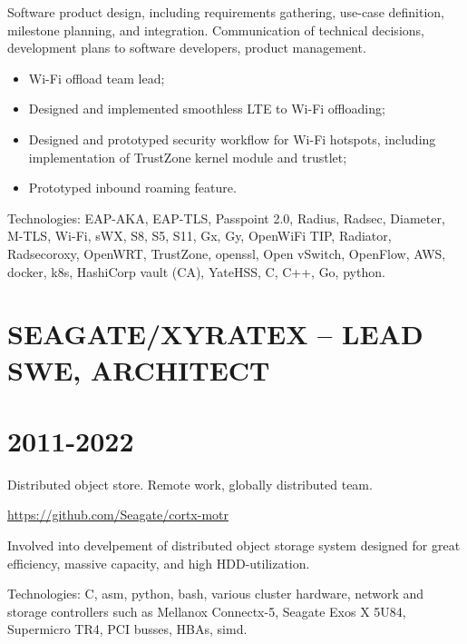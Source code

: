 \documentclass[8pt,a4paper]{article}
\begin{document}
Software product design, including requirements gathering, use-case
definition, milestone planning, and integration. Communication of
technical decisions, development plans to software developers,
product management.

\begin{itemize}
\item Wi-Fi offload team lead;
\item Designed and implemented smoothless LTE to Wi-Fi offloading;
\item Designed and prototyped security workflow for Wi-Fi hotspots,
including implementation of TrustZone kernel module and trustlet;
\item Prototyped inbound roaming feature.
\end{itemize}

Technologies: EAP-AKA, EAP-TLS, Passpoint 2.0, Radius, Radsec,
Diameter, M-TLS, Wi-Fi, sWX, S8, S5, S11, Gx, Gy, OpenWiFi TIP,
Radiator, Radsecoroxy, OpenWRT, TrustZone, openssl, Open vSwitch,
OpenFlow, AWS, docker, k8s, HashiCorp vault (CA), YateHSS, C, C++,
Go, python.


\section*{SEAGATE/XYRATEX -- LEAD SWE, ARCHITECT}
\label{sec:org223daaa}
\section*{2011-2022}
\label{sec:org5c9ee24}

Distributed object store. Remote work, globally distributed team.

\url{https://github.com/Seagate/cortx-motr}

Involved into develpement of distributed object storage system
designed for great efficiency, massive capacity, and high
HDD-utilization.

Technologies: C, asm, python, bash, various cluster hardware, network
	      and storage controllers such as Mellanox Connectx-5,
	      Seagate Exos X 5U84, Supermicro TR4, PCI busses, HBAs,
	      simd.
\end{document}
